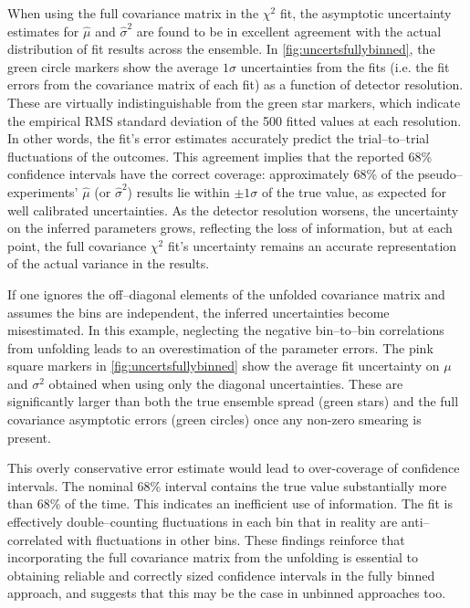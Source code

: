             When using the full covariance matrix in the $\chi^2$ fit, the asymptotic uncertainty estimates for $\hat{\mu}$ and $\hat{\sigma}^2$ are found to be in excellent agreement with the actual distribution of fit results across the ensemble.
            In \cref{fig:uncertsfullybinned}, the green circle markers show the average $1\sigma$ uncertainties from the fits (i.e. the fit errors from the covariance matrix of each fit) as a function of detector resolution.
            These are virtually indistinguishable from the green star markers, which indicate the empirical RMS standard deviation of the 500 fitted values at each resolution.
            In other words, the fit’s error estimates accurately predict the trial--to--trial fluctuations of the outcomes.
            This agreement implies that the reported 68\% confidence intervals have the correct coverage:
            approximately 68\% of the pseudo--experiments' $\hat{\mu}$ (or $\hat{\sigma}^2$) results lie within $\pm1\sigma$ of the true value, as expected for well calibrated uncertainties.
            As the detector resolution worsens, the uncertainty on the inferred parameters grows, reflecting the loss of information, but at each point, the full covariance \(\chi^2\) fit's uncertainty remains an accurate representation of the actual variance in the results.
    
            If one ignores the off--diagonal elements of the unfolded covariance matrix and assumes the bins are independent, the inferred uncertainties become misestimated.
            In this example, neglecting the negative bin--to--bin correlations from unfolding leads to an overestimation of the parameter errors.
            The pink square markers in \cref{fig:uncertsfullybinned} show the average fit uncertainty on $\mu$ and $\sigma^2$ obtained when using only the diagonal uncertainties.
            These are significantly larger than both the true ensemble spread (green stars) and the full covariance asymptotic errors (green circles) once any non-zero smearing is present.

            This overly conservative error estimate would lead to over-coverage of confidence intervals.
            The nominal 68\% interval contains the true value substantially more than 68\% of the time.
            This indicates an inefficient use of information.
            The fit is effectively double--counting fluctuations in each bin that in reality are anti--correlated with fluctuations in other bins.
            These findings reinforce that incorporating the full covariance matrix from the unfolding is essential to obtaining reliable and correctly sized confidence intervals in the fully binned approach, and suggests that this may be the case in unbinned approaches too.
            
